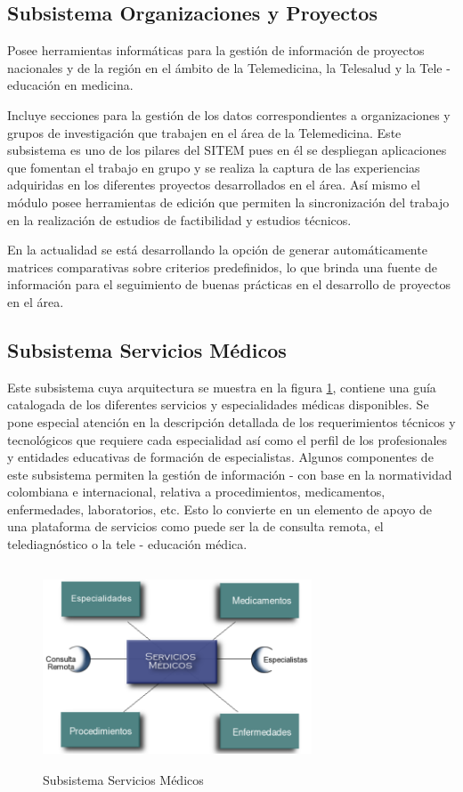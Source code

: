 \subsection{Subsistema Organizaciones y Proyectos} 

Posee herramientas informáticas para la gestión de información de proyectos nacionales y de la región en el ámbito de la Telemedicina, la Telesalud y la Tele - educación en medicina. 

Incluye secciones para la gestión de los datos correspondientes a organizaciones y grupos de investigación que trabajen en el área de la Telemedicina.  Este subsistema es uno de los pilares del SITEM pues en él se despliegan aplicaciones que fomentan el trabajo en grupo y se realiza la captura de las experiencias adquiridas en los diferentes proyectos desarrollados en el área. Así mismo el módulo posee herramientas de edición que permiten la sincronización del trabajo en la realización de estudios de factibilidad y estudios técnicos.

En la actualidad se está desarrollando la opción de generar automáticamente matrices comparativas sobre criterios predefinidos, lo que brinda una fuente de información para el seguimiento de buenas prácticas en el desarrollo de proyectos en el área.

\subsection{Subsistema Servicios Médicos} 
Este subsistema cuya arquitectura se muestra en la figura \ref{servicios}, contiene una guía catalogada de los diferentes servicios y especialidades médicas disponibles. Se pone especial atención en la descripción detallada de los requerimientos técnicos y tecnológicos que requiere cada especialidad así como el perfil de los profesionales y entidades educativas de formación de especialistas. Algunos componentes de este subsistema permiten la gestión de información - con base en la normatividad colombiana e internacional, relativa a procedimientos, medicamentos, enfermedades, laboratorios, etc. Esto lo convierte en un elemento de apoyo de una plataforma de servicios como puede ser la de consulta remota, el telediagnóstico o la tele - educación médica.

\begin{figure}
 \centering
 \includegraphics[width=80mm, height=60mm]{servicios.png}
 \caption{Subsistema Servicios Médicos}
 \label{servicios}
\end{figure}


